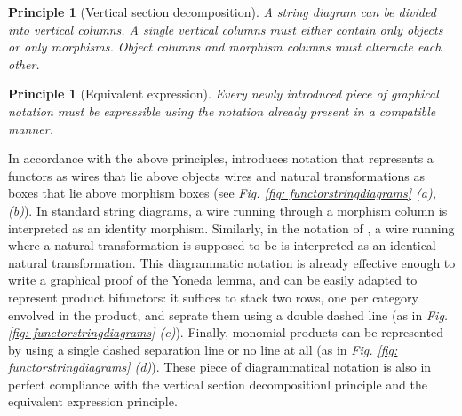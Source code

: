 \documentclass[11pt,a4paper,openright,twoside]{report}
\newcounter{mycounter}
\theoremstyle{plain}
\newtheorem{principle}[mycounter]{Principle}
\theoremstyle{definition}
\begin{document}
\begin{principle}[Vertical section decomposition]
  A string diagram can be divided into vertical columns. A single vertical columns must either contain only objects or only morphisms. Object columns and morphism columns must alternate each other.
\end{principle}

\begin{principle}[Equivalent expression]
  Every newly introduced piece of graphical notation must be expressible using the notation already present in a compatible manner.
\end{principle}

In accordance with the above principles, \cite{abbott2023robust} introduces notation that represents a functors as wires that lie above objects wires and natural transformations as boxes that lie above morphism boxes (see \textit{Fig. \ref{fig: functorstringdiagrams} (a), (b)}). In standard string diagrams, a wire running through a morphism column is interpreted as an identity morphism. Similarly, in the notation of \cite{abbott2023robust}, a wire running where a natural transformation is supposed to be is interpreted as an identical natural transformation. This diagrammatic notation is already effective enough to write a graphical proof of the Yoneda lemma, and can be easily adapted to represent product bifunctors: it suffices to stack two rows, one per category envolved in the product, and seprate them using a double dashed line (as in \textit{Fig. \ref{fig: functorstringdiagrams} (c)}). Finally, monomial products can be represented by using a single dashed separation line or no line at all (as in \textit{Fig. \ref{fig: functorstringdiagrams} (d)}). These piece of diagrammatical notation is also in perfect compliance with the vertical section decompositionl principle and the equivalent expression principle.
\end{document}
